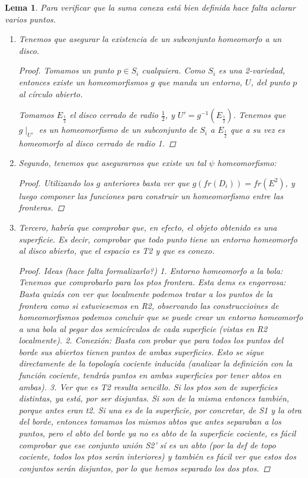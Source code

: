 \documentclass[a4paper,11pt,spanish, twoside, leqno]{tfg-uam}
\newtheorem{lema}[teor]{Lema}
\theoremstyle{definition}
\begin{document}
\begin{lema}\label{lema:sumaconexa}
	Para verificar que la suma conexa está bien definida hace falta aclarar varios puntos.
	\begin{enumerate}
		\item 
		Tenemos que asegurar la existencia de un subconjunto homeomorfo a un disco.
		\begin{proof}
			Tomamos un punto $p\in S_i$ cualquiera. Como $S_i$ es una 2-variedad, entonces existe un homeomorfismos $g$ que manda un entorno, $U$, del punto $p$ al círculo abierto. 
			
			Tomamos $E_{\frac{1}{2}}$ el disco cerrado de radio $\frac{1}{2}$, y $U'= g^{-1}(E_{\frac{1}{2}})$. Tenemos que $g\mid_{U'}$ es un homeomorfismo de un subconjunto de $S_i$ a $E_{\frac{1}{2}}$ que a su vez es homeomorfo al disco cerrado de radio 1. 
		\end{proof} 
		\item 
		Segundo, tenemos que asegurarnos que existe un tal $\psi$ homeomorfismo:
		\begin{proof}
			Utilizando los $g$ anteriores basta ver que  $g(fr(D_i))=fr(E^2)$, y luego componer las funciones para construir un homeomorfismo entre las fronteras.
		\end{proof}
		\item 
		Tercero, habría que comprobar que, en efecto, el objeto obtenido es una superficie. Es decir, comprobar que todo punto tiene un entorno homeomorfo al disco abierto, que el espacio es T2 y que es conexo.
		\begin{proof}
			Ideas (hace falta formalizarlo?)
			1. Entorno homeomorfo a la bola: Tenemos que comprobarlo para los ptos frontera. Esta dems es engorrosa: Basta quizás con ver que localmente podemos tratar a los puntos de la frontera como si estuviesemos en R2, observando las construccioines de homeomorfismos podemos concluir que se puede crear un entorno homeomorfo a una bola al pegar dos semicírculos de cada superficie (vistas en R2 localmente). 
			2. Conexión: Basta con probar que para todos los puntos del borde  sus abiertos tienen puntos de ambas superficies. Esto se sigue directamente de la topología cociente inducida (analizar la definición con la función cociente, tendrás puntos en ambas superficies por tener abtos en ambas).
			3. Ver que es T2 resulta sencillo. Si los ptos son de superficies distintas, ya está, por ser disjuntas. Si son de la misma entonces también, porque antes eran t2. Si una es de la superficie, por concretar, de S1 y la otra del borde, entonces tomamos los mismos abtos que antes separaban a los puntos, pero el abto del borde ya no es abto de la superficie cociente, es fácil comprobar que ese conjunto unión S2' sí es un abto (por la def de topo cociente, todos los ptos serán interiores) y también es fácil ver que estos dos conjuntos serán disjuntos, por lo que hemos separado los dos ptos.

\end{proof}
\end{enumerate}
\end{lema}
\end{document}
